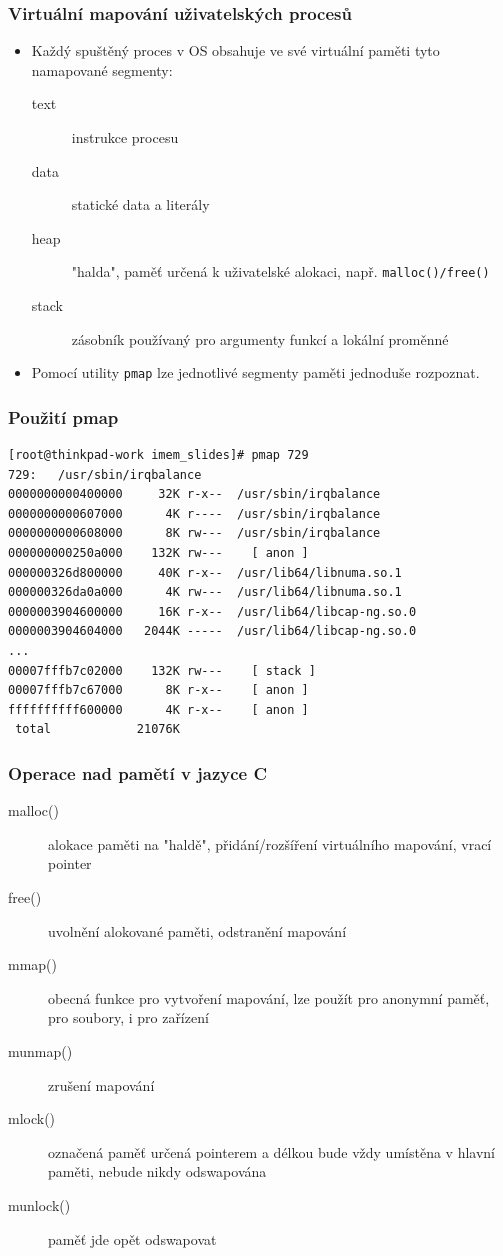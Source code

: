\documentclass[professionalfonts,svgnames]{beamer}
\begin{document}
 \begin{frame}
\frametitle{Virtuální mapování uživatelských procesů}
\begin{itemize}
\item Každý spuštěný proces v OS obsahuje ve své virtuální paměti tyto namapované segmenty:
	\begin{description}
		\item[text] instrukce procesu
		\item[data] statické data a literály
		\item[heap] "halda", paměť určená k uživatelské alokaci, např. \texttt{malloc()/free()}
		\item[stack] zásobník používaný pro argumenty funkcí a lokální proměnné
	\end{description}
\item Pomocí utility \texttt{pmap} lze jednotlivé segmenty paměti jednoduše rozpoznat.
\end{itemize}
\end{frame}

 \begin{frame}[fragile]
\frametitle{Použití pmap}
\begin{verbatim}
[root@thinkpad-work imem_slides]# pmap 729
729:   /usr/sbin/irqbalance
0000000000400000     32K r-x--  /usr/sbin/irqbalance
0000000000607000      4K r----  /usr/sbin/irqbalance
0000000000608000      8K rw---  /usr/sbin/irqbalance
000000000250a000    132K rw---    [ anon ]
000000326d800000     40K r-x--  /usr/lib64/libnuma.so.1
000000326da0a000      4K rw---  /usr/lib64/libnuma.so.1
0000003904600000     16K r-x--  /usr/lib64/libcap-ng.so.0
0000003904604000   2044K -----  /usr/lib64/libcap-ng.so.0
...
00007fffb7c02000    132K rw---    [ stack ]
00007fffb7c67000      8K r-x--    [ anon ]
ffffffffff600000      4K r-x--    [ anon ]
 total            21076K
\end{verbatim}
\end{frame}

 \begin{frame}
\frametitle{Operace nad pamětí v jazyce C}
\begin{description}
\item[malloc()] alokace paměti na "haldě", přidání/rozšíření virtuálního mapování, vrací pointer
\item[free()] uvolnění alokované paměti, odstranění mapování
\item[mmap()] obecná funkce pro vytvoření mapování, lze použít pro anonymní paměť, pro soubory, i pro zařízení
\item[munmap()] zrušení mapování
\item[mlock()] označená paměť určená pointerem a délkou bude vždy umístěna v hlavní paměti, nebude nikdy odswapována
\item[munlock()] paměť jde opět odswapovat
\end{description}
\end{frame}
\end{document}
